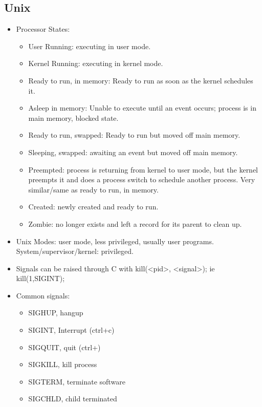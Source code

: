 \documentclass[fontsize=5pt]{scrartcl}
\begin{document}
\begin{multicols}{3}
    \section{Unix}
      \begin{itemize}
       \item Processor States:
        \begin{itemize}
         \item User Running: executing in user mode.
         \item Kernel Running: executing in kernel mode.
         \item Ready to run, in memory: Ready to run as soon as the kernel schedules it.
         \item Asleep in memory: Unable to execute until an event occurs; process is in main memory, blocked state.
         \item Ready to run, swapped: Ready to run but moved off main memory.
         \item Sleeping, swapped: awaiting an event but moved off main memory.
         \item Preempted: process is returning from kernel to user mode, but the kernel preempts it and does a process switch
               to schedule another process. Very similar/same as ready to run, in memory.
         \item Created: newly created and ready to run.
         \item Zombie: no longer exists and left a record for its parent to clean up.
        \end{itemize}
        \item Unix Modes: user mode, less privileged, usually user programs. System/supervisor/kernel: privileged.
        \item Signals can be raised through C with kill(<pid>, <signal>); ie kill(1,SIGINT);
        \item Common signals:
        \begin{itemize}
          \item SIGHUP, hangup
          \item SIGINT, Interrupt (ctrl+c)
          \item SIGQUIT, quit (ctrl+\textbacklash)
          \item SIGKILL, kill process
          \item SIGTERM, terminate software
          \item SIGCHLD, child terminated
        \end{itemize}


\end{itemize}
\end{multicols}
\end{document}
